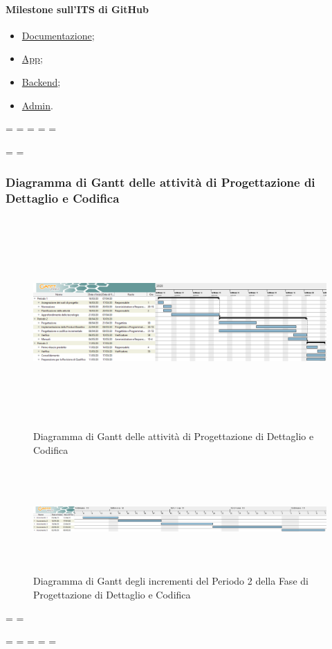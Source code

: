 \paragraph{Milestone sull'ITS di GitHub}
\begin{itemize}
	\item \href{https://github.com/qb-team/Stalker-Documentazione/milestone/13}{Documentazione};
	\item \href{https://github.com/qb-team/Stalker-App/milestone/3}{App};
	\item \href{https://github.com/qb-team/Stalker-Backend/milestone/3}{Backend};
	\item \href{https://github.com/qb-team/Stalker-Admin/milestone/3}{Admin}.
\end{itemize}

\newpage
\paperwidth=\pdfpageheight
\paperheight=\pdfpagewidth
\pdfpageheight=\paperheight
\pdfpagewidth=\paperwidth
\headwidth=\textheight

\begingroup 
\vsize=\textwidth
\hsize=\textheight

\subsubsection{Diagramma di Gantt delle attività di Progettazione di Dettaglio e Codifica}
\pagestyle{empty}
\begin{figure}[h]
	\centering
	\includegraphics[height = 8cm, width = 24.5cm]{Sezioni/Immagini/DiagrammiGantt/ProgettazioneDiDettaglio.png}
	\caption{Diagramma di Gantt delle attività di Progettazione di Dettaglio e Codifica}
\end{figure}

\begin{figure}[h]
	\centering
	\includegraphics[height = 4cm, width = 24.5cm]{Sezioni/Immagini/DiagrammiGantt/PianificazioneTemporaleIncrementi.png}
	\caption{Diagramma di Gantt degli incrementi del Periodo 2 della Fase di Progettazione di Dettaglio e Codifica}
\end{figure}

\textwidth=\hsize
\textheight=\vsize

\endgroup
\newpage
\paperwidth=\pdfpageheight
\paperheight=\pdfpagewidth
\pdfpageheight=\paperheight
\pdfpagewidth=\paperwidth
\headwidth=\textwidth